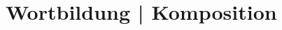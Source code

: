 \documentclass[handout,aspectratio=1610,dvipsnames]{beamer}
\begin{document}
  \section[Komposition]{Wortbildung | Komposition}
  \let\woopsi\section\let\section\subsection\let\subsection\subsubsection
  
  \let\subsection\section\let\section\woopsi
  
\end{document}
